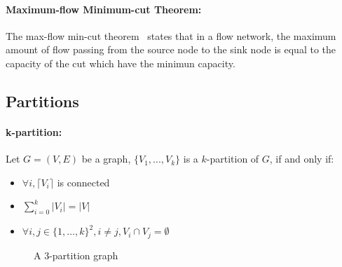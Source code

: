 \paragraph{Maximum-flow Minimum-cut Theorem:}
The max-flow min-cut theorem~\cite{FD55} states that in a flow network, the maximum amount
of flow passing from the source node to the sink node is equal to the capacity
of the cut which have the minimun capacity.

\subsection{Partitions}
\paragraph{k-partition:}
Let $G = (V,E)$ be a graph,  $\{V_1,...,V_k\}$ is a $k$-partition of $G$, if
and only if:
\begin{itemize}
    \item $\forall i, \lceil V_i \rceil$ is connected
    \item $\sum\limits_{i=0}^k|V_i| = |V|$
    \item $\forall i,j \in \{1, \dots, k\}^2, i \neq j, V_i \cap V_j = \emptyset$
\end{itemize}

\begin{figure}[!h]
    \caption{A 3-partition graph}
    \begin{center}
        
    \end{center}
\end{figure}

